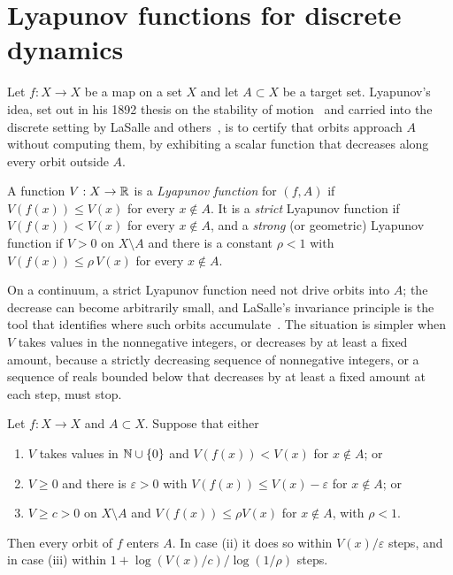 \section{Lyapunov functions for discrete dynamics}\label{sec:ch4:discrete}

Let $f:X\to X$ be a map on a set $X$ and let $A\subset X$ be a target set.
Lyapunov's idea, set out in his 1892 thesis on the stability of motion~\cite{lyapunov1992} and
carried into the discrete setting by LaSalle and others~\cite{lasalle1986}, is
to certify that orbits approach $A$ without computing them, by exhibiting a
scalar function that decreases along every orbit outside $A$.

\begin{definition}\label{def:ch4:lyap}
A function $V:X\to\mathbb{R}$ is a \emph{Lyapunov function} for $(f,A)$ if
$V(f(x))\le V(x)$ for every $x\notin A$.  It is a \emph{strict} Lyapunov
function if $V(f(x))<V(x)$ for every $x\notin A$, and a \emph{strong} (or
geometric) Lyapunov function if $V>0$ on $X\setminus A$ and there is a
constant $\rho<1$ with $V(f(x))\le\rho\,V(x)$ for every $x\notin A$.
\end{definition}

On a continuum, a strict Lyapunov function need not drive orbits into $A$;
the decrease can become arbitrarily small, and LaSalle's invariance principle
is the tool that identifies where such orbits accumulate~\cite{lasalle1986}.
The situation is simpler when $V$ takes values in the nonnegative integers, or decreases by at least a fixed amount, because a strictly decreasing sequence of nonnegative integers, or a sequence of reals bounded below that decreases by at least a fixed amount at each step, must stop.

\begin{proposition}\label{prop:ch4:discrete}
Let $f:X\to X$ and $A\subset X$.  Suppose that either
\begin{enumerate}[label=(\roman*)]
\item $V$ takes values in $\mathbb{N}\cup\{0\}$ and $V(f(x))<V(x)$ for $x\notin A$; or
\item $V\ge0$ and there is $\varepsilon>0$ with $V(f(x))\le V(x)-\varepsilon$
  for $x\notin A$; or
\item $V\ge c>0$ on $X\setminus A$ and $V(f(x))\le\rho V(x)$ for $x\notin A$,
  with $\rho<1$.
\end{enumerate}
Then every orbit of $f$ enters $A$.  In case (ii) it does so within
$V(x)/\varepsilon$ steps, and in case (iii) within
$1+\log(V(x)/c)/\log(1/\rho)$ steps.
\end{proposition}

